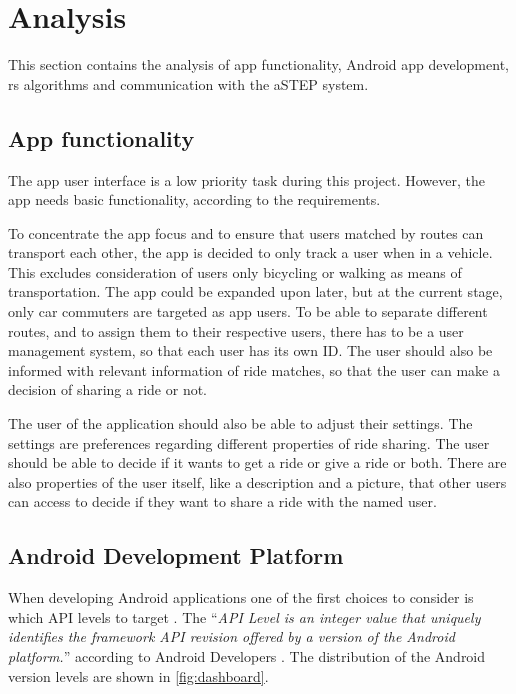 \section{Analysis}
This section contains the analysis of app functionality, Android app development, \gls{rs} algorithms and communication with the aSTEP system.

\subsection{App functionality}
The app user interface is a low priority task during this project.
However, the app needs basic functionality, according to the requirements.

To concentrate the app focus and to ensure that users matched by routes can transport each other, the app is decided to only track a user when in a vehicle.
This excludes consideration of users only bicycling or walking as means of transportation.
The app could be expanded upon later, but at the current stage, only car commuters are targeted as app users.
To be able to separate different routes, and to assign them to their respective users, there has to be a user management system, so that each user has its own ID.
The user should also be informed with relevant information of ride matches, so that the user can make a decision of sharing a ride or not.

The user of the application should also be able to adjust their settings.
The settings are preferences regarding different properties of ride sharing.
The user should be able to decide if it wants to get a ride or give a ride or both.
There are also properties of the user itself, like a description and a picture, that other users can access to decide if they want to share a ride with the named user.


\subsection{Android Development Platform}
When developing Android applications one of the first choices to consider is which API levels to target \cite{usesSDK}.
The ``\textit{API Level is an integer value that uniquely identifies the framework API revision offered by a version of the Android platform.}'' according to Android Developers \cite{usesSDK}.
The distribution of the Android version levels are shown in \ref{fig:dashboard}.

